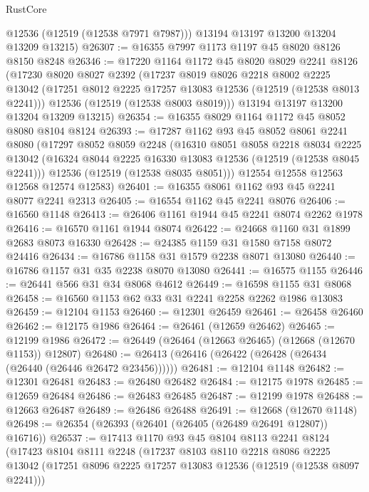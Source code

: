 \begin{lexlean}{RustCore}
\begin{coremodule}
        @12536
        (@12519 (@12538 @7971 @7987)))
      @13194
      @13197
      @13200
      @13204
      @13209
      @13215)
@26307 := @16355 @7997 @1173 @1197 @45 @8020 @8126 @8150 @8248
@26346 := @17220
    @1164
    @1172
    @45
    @8020
    @8029
    @2241
    @8126
    (@17230
      @8020
      @8027
      @2392
      (@17237
        @8019
        @8026
        @2218
        @8002
        @2225
        @13042
        (@17251 @8012 @2225 @17257 @13083 @12536 (@12519 (@12538 @8013 @2241)))
        @12536
        (@12519 (@12538 @8003 @8019)))
      @13194
      @13197
      @13200
      @13204
      @13209
      @13215)
@26354 := @16355 @8029 @1164 @1172 @45 @8052 @8080 @8104 @8124
@26393 := @17287
    @1162
    @93
    @45
    @8052
    @8061
    @2241
    @8080
    (@17297
      @8052
      @8059
      @2248
      (@16310
        @8051
        @8058
        @2218
        @8034
        @2225
        @13042
        (@16324 @8044 @2225 @16330 @13083 @12536 (@12519 (@12538 @8045 @2241)))
        @12536
        (@12519 (@12538 @8035 @8051)))
      @12554
      @12558
      @12563
      @12568
      @12574
      @12583)
@26401 := @16355 @8061 @1162 @93 @45 @2241 @8077 @2241 @2313
@26405 := @16554 @1162 @45 @2241 @8076
@26406 := @16560 @1148
@26413 := @26406 @1161 @1944 @45 @2241 @8074 @2262 @1978
@26416 := @16570 @1161 @1944 @8074
@26422 := @24668 @1160 @31 @1899 @2683 @8073 @16330
@26428 := @24385 @1159 @31 @1580 @7158 @8072 @24416
@26434 := @16786 @1158 @31 @1579 @2238 @8071 @13080
@26440 := @16786 @1157 @31 @35 @2238 @8070 @13080
@26441 := @16575 @1155
@26446 := @26441 @566 @31 @34 @8068 @4612
@26449 := @16598 @1155 @31 @8068
@26458 := @16560 @1153 @62 @33 @31 @2241 @2258 @2262 @1986 @13083
@26459 := @12104 @1153
@26460 := @12301 @26459
@26461 := @26458 @26460
@26462 := @12175 @1986
@26464 := @26461 (@12659 @26462)
@26465 := @12199 @1986
@26472 := @26449 (@26464 (@12663 @26465) (@12668 (@12670 @1153)) @12807)
@26480 := @26413 (@26416 (@26422 (@26428 (@26434 (@26440 (@26446 @26472 @23456))))))
@26481 := @12104 @1148
@26482 := @12301 @26481
@26483 := @26480 @26482
@26484 := @12175 @1978
@26485 := @12659 @26484
@26486 := @26483 @26485
@26487 := @12199 @1978
@26488 := @12663 @26487
@26489 := @26486 @26488
@26491 := @12668 (@12670 @1148)
@26498 := @26354 (@26393 (@26401 (@26405 (@26489 @26491 @12807)) @16716))
@26537 := @17413
    @1170
    @93
    @45
    @8104
    @8113
    @2241
    @8124
    (@17423
      @8104
      @8111
      @2248
      (@17237
        @8103
        @8110
        @2218
        @8086
        @2225
        @13042
        (@17251 @8096 @2225 @17257 @13083 @12536 (@12519 (@12538 @8097 @2241)))

\end{coremodule}
\end{lexlean}
